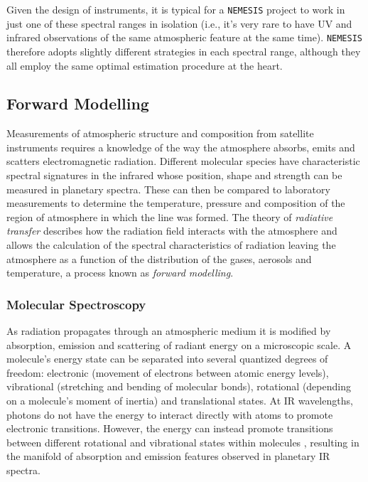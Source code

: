 \documentclass[final,5p,times,twocolumn,authoryear]{elsarticle}
\begin{document}
Given the design of instruments, it is typical for a \verb#NEMESIS# project to work in just one of these spectral ranges in isolation (i.e., it's very rare to have UV and infrared observations of the same atmospheric feature at the same time).  \verb#NEMESIS# therefore adopts slightly different strategies in each spectral range, although they all employ the same optimal estimation procedure at the heart.

\subsection{Forward Modelling}

Measurements of atmospheric structure and composition from satellite instruments requires a knowledge of the way the atmosphere absorbs, emits and scatters electromagnetic radiation.  Different molecular species have characteristic spectral signatures in the infrared whose position, shape and strength can be measured in planetary spectra. These can then be compared to laboratory measurements to determine the temperature, pressure and composition of the region of atmosphere in which the line was formed.  The theory of \textit{radiative transfer} describes how the radiation field interacts with the atmosphere and allows the calculation of the spectral characteristics of radiation leaving the atmosphere as a function of the distribution of the gases, aerosols and temperature, a process known as \textit{forward modelling}. 

\subsubsection{Molecular Spectroscopy}

As radiation propagates through an atmospheric medium it is modified by absorption, emission and scattering of radiant energy on a microscopic scale.  A molecule's energy state can be separated into several quantized degrees of freedom:  electronic (movement of electrons between atomic energy levels), vibrational (stretching and bending of molecular bonds), rotational (depending on a molecule's moment of inertia) and translational states.  At IR wavelengths, photons do not have the energy to interact directly with atoms to promote electronic transitions.  However, the energy can instead promote transitions between different rotational and vibrational states within molecules \citep[e.g.,][]{03irwbook}, resulting in the manifold of absorption and emission features observed in planetary IR spectra.
\end{document}
